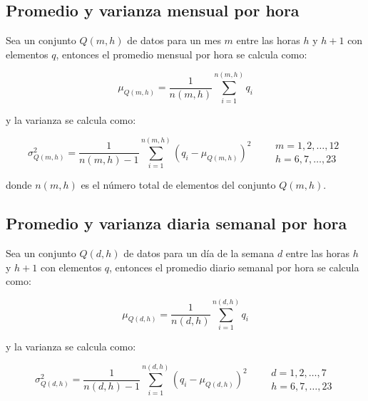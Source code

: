 \subsection{Promedio y varianza mensual por hora}

Sea un conjunto $Q(m,h)$ de datos para un mes $m$  entre las horas $h$ y $h+1$ con elementos $q$, entonces el promedio mensual por hora se calcula como:

\begin{equation}
    \mu_{Q(m,h)} = \frac{1}{n(m,h)} \sum_{i=1}^{n(m,h)} q_i \label{eq:monthly_hourly_mean}
\end{equation}

y la varianza se calcula como:

\begin{equation}
    \sigma^2_{Q(m,h)} = \frac{1}{n(m,h)-1} \sum_{i=1}^{n(m,h)} (q_i - \mu_{Q(m,h)})^2 \qquad \begin{matrix}
        m=1,2,\dots,12 \\
        h=6,7,\dots,23
    \end{matrix} \label{eq:monthly_hourly_var}
\end{equation}

donde $n(m,h)$ es el número total de elementos del conjunto $Q(m,h)$.

\subsection{Promedio y varianza diaria semanal por hora}

Sea un conjunto $Q(d,h)$ de datos para un día de la semana $d$  entre las horas $h$ y $h+1$ con elementos $q$, entonces el promedio diario semanal por hora se calcula como:

\begin{equation}
    \mu_{Q(d,h)} = \frac{1}{n(d,h)} \sum_{i=1}^{n(d,h)} q_i \label{eq:daily_hourly_mean}
\end{equation}

y la varianza se calcula como:

\begin{equation}
    \sigma^2_{Q(d,h)} = \frac{1}{n(d,h)-1} \sum_{i=1}^{n(d,h)} (q_i - \mu_{Q(d,h)})^2 \qquad \begin{matrix}
        d=1,2,\dots,7 \\
        h=6,7,\dots,23
    \end{matrix} \label{eq:daily_hourly_var}
\end{equation}


